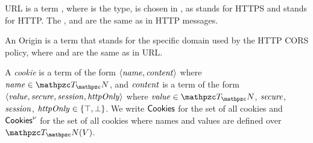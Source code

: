 \begin{definition}[URLs]
URL is a term , where  is the type,  is chosen in ,  as  stands for HTTPS and  stands for HTTP. The , and  are the same as in HTTP messages.
\end{definition}

\begin{definition}[Origins]
An Origin is a term  that stands for the specific domain used by the HTTP CORS policy, where  and  are the same as in URL.
\end{definition}

\begin{definition}[Cookies]
A \emph{cookie} is a term of the form
  $\langle\mathit{name}, \mathit{content}\rangle$ where $\mi{name} \in
  \terms$, and $\mathit{content}$ is a term of the form
  $\langle\mathit{value}, \mathit{secure}, \mathit{session},
    \mathit{httpOnly}\rangle$ where $\mi{value} \in \terms$,
  $\mathit{secure}$, $\mathit{session}$, $\mathit{httpOnly} \in
  \{\top, \bot\}$. We write $\mathsf{Cookies}$ for the set of all
  cookies and $\mathsf{Cookies}^\nu$ for the set of all cookies
  where names and values are defined over $\terms(V)$.
\end{definition}

